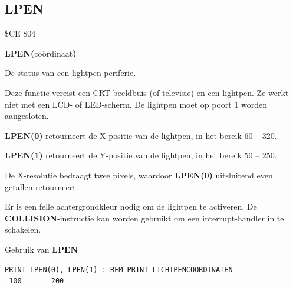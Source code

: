 \subsection{LPEN}
\begin{description}[leftmargin=2cm,style=nextline]
\item [Token:]    \$CE \$04

\item [Formaat:]   {\bf LPEN(}coördinaat{\bf)}

\item [Retourneert:]  De status van een lightpen-periferie.

                  Deze functie vereist een CRT-beeldbuis (of televisie) en een lightpen. Ze werkt niet met een LCD- of LED-scherm. De lightpen moet op poort 1 worden aangesloten.

                  {\bf LPEN(0)} retourneert de X-positie van de lightpen, in het bereik 60 -- 320.

                  {\bf LPEN(1)} retourneert de Y-positie van de lightpen, in het bereik 50 -- 250.

\item [Opmerkingen:]  De X-resolutie bedraagt twee pixels, waardoor {\bf LPEN(0)} uitsluitend even getallen retourneert.

                  Er is een felle achtergrondkleur nodig om de lightpen te activeren. De {\bf COLLISION}-instructie kan worden gebruikt om een interrupt-handler in te schakelen.

\item [Voorbeeld:]  Gebruik van {\bf LPEN}

\begin{tcolorbox}[colback=black,coltext=white]
\verbatimfont{\codefont}
\begin{verbatim}
PRINT LPEN(0), LPEN(1) : REM PRINT LICHTPENCOORDINATEN
 100       200
\end{verbatim}
\end{tcolorbox}
\end{description}


\newpage

